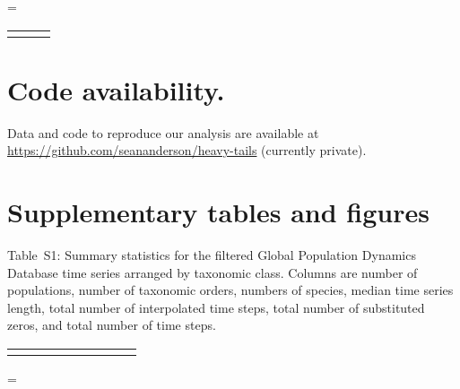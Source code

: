 \documentclass[12pt]{article}
\begin{document}
\LTcapwidth=\textwidth
\singlespacing
\begin{footnotesize}
\begin{longtable}{>{\RaggedRight}m{3.2cm}>{\RaggedRight}p{6.5cm}>{\RaggedRight}p{5.0cm}}
\toprule

\label{tab:phylopic}
\end{longtable}
\end{footnotesize}
\onehalfspacing

\section{Code availability.} Data and code to reproduce our analysis are
available at \url{https://github.com/seananderson/heavy-tails} (currently
private).

%



\clearpage

\section{Supplementary tables and figures}


\singlespacing

Table~S1: Summary statistics for the filtered Global Population
Dynamics Database time series arranged by taxonomic class. Columns are number
of populations, number of taxonomic orders, numbers of species, median time
series length, total number of interpolated time steps, total number of
substituted zeros, and total number of time steps.

\onehalfspacing

\smallskip
\begin{scriptsize}
\begin{tabular}{lrrrrrrrr}
\toprule

\label{tab:stats}
\end{tabular}
\end{scriptsize}

\clearpage

\LTcapwidth=\textwidth
\end{document}
